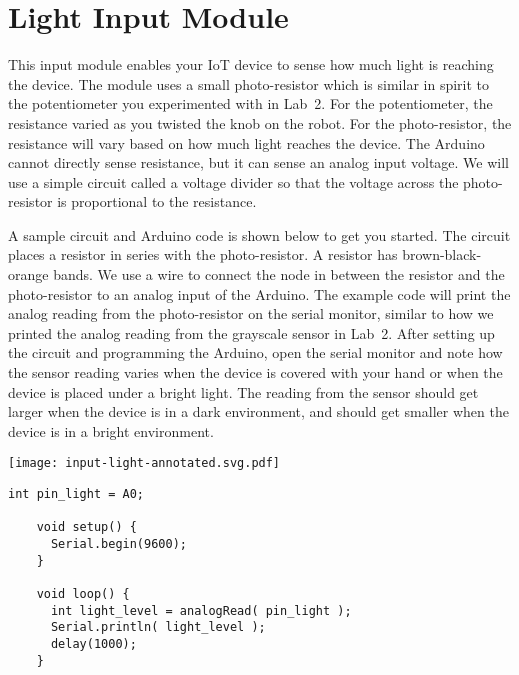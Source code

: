 
\clearpage
\section{Light Input Module}
\label{sec-input-light}

This input module enables your IoT device to sense how much light is
reaching the device. The module uses a small photo-resistor which is
similar in spirit to the potentiometer you experimented with in Lab~2.
For the potentiometer, the resistance varied as you twisted the knob on
the robot. For the photo-resistor, the resistance will vary based on how
much light reaches the device. The Arduino cannot directly sense
resistance, but it can sense an analog input voltage. We will use a
simple circuit called a voltage divider so that the voltage across the
photo-resistor is proportional to the resistance.

A sample circuit and Arduino code is shown below to get you started. The
circuit places a  resistor in series with the
photo-resistor. A  resistor has brown-black-orange
bands. We use a wire to connect the node in between the resistor and the
photo-resistor to an analog input of the Arduino. The example code will
print the analog reading from the photo-resistor on the serial monitor,
similar to how we printed the analog reading from the grayscale sensor in
Lab~2. After setting up the circuit and programming the Arduino, open the
serial monitor and note how the sensor reading varies when the device is
covered with your hand or when the device is placed under a bright light.
The reading from the sensor should get larger when the device is in a
dark environment, and should get smaller when the device is in a bright
environment.

\vspace{0.1in}
\begin{minipage}[t]{0.49\tw}
  \vspace{0pt}

  \texttt{[image: input-light-annotated.svg.pdf]}
\end{minipage}
\hfill
\begin{minipage}[t]{0.49\tw}
  \vspace{0.1in}
  \begin{Verbatim}[gobble=3,fontsize=\small]
    int pin_light = A0;

    void setup() {
      Serial.begin(9600);
    }

    void loop() {
      int light_level = analogRead( pin_light );
      Serial.println( light_level );
      delay(1000);
    }
  \end{Verbatim}
\end{minipage}

